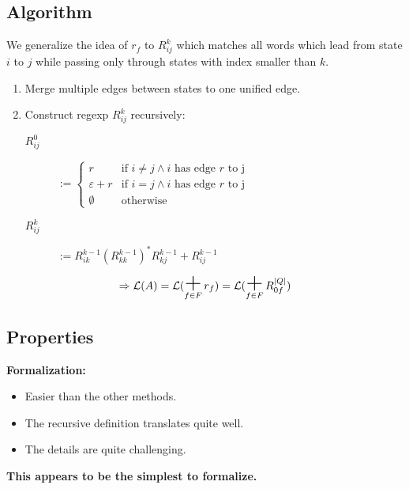 \documentclass{beamer}
\DeclareMathOperator*{\bigplus}{\mbox{\huge +}}
\begin{document}
\subsection*{Algorithm}
\begin{frame}

    We generalize the idea of $r_f$ to $R^k_{i j}$ which matches all words which lead from state $i$ to $j$ while passing only through states with index smaller than $k$.

    \begin{enumerate}
        \item 
            Merge multiple edges between states to one unified edge.
        \item
            Construct regexp $R^k_{i j}$ recursively:

            \begin{description}

                \item[$R^0_{i j}$]
                    $ := \begin{cases} 
                        r & \mbox{if } i \neq j \wedge i \mbox{ has edge } r \mbox{ to j}  \\
          \varepsilon + r & \mbox{if } i = j \wedge i \mbox{ has edge } r \mbox{ to j}  \\
                \emptyset & \mbox{otherwise}
                    \end{cases}
                    $ 

                \item[$R^k_{i j}$]
                    $ := R^{k-1}_{i k} (R^{k-1}_{k k})^* R^{k-1}_{k j} + R^{k-1}_{i j}$

            \end{description}

    \end{enumerate}

    \[ 
        \Rightarrow \mathcal{L}(A) = \mathcal{L}(\bigplus_{f \in F} r_f) = \mathcal{L}(\bigplus_{f \in F} R^{|Q|}_{0 f}) 
    \]

\end{frame}

\subsection*{Properties}
\begin{frame}
    \textbf{Formalization:} \\
    \begin{itemize}
        \item
            Easier than the other methods.\\
        \item
            The recursive definition translates quite well.\\
        \item
            The details are quite challenging.
    \end{itemize} 

    \pause

    {\centering 
        \textbf{This appears to be the simplest to formalize.}

    }
\end{frame}
\end{document}
